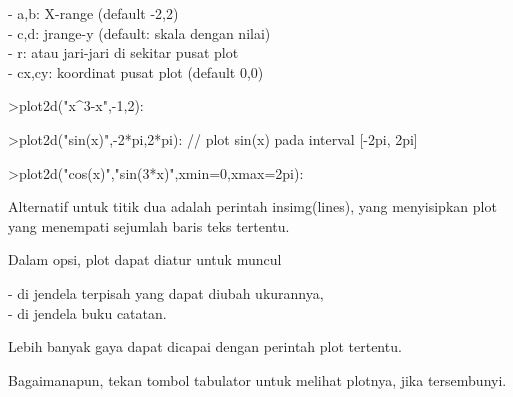 \documentclass[a4paper,10pt]{article}
\begin{document}
\begin{eulernotebook}
\begin{eulercomment}
\begin{eulercomment}
\begin{eulercomment}
\begin{eulercomment}
\begin{eulercomment}
\begin{eulercomment}
\begin{eulercomment}
\begin{eulercomment}
\begin{eulercomment}
\begin{eulercomment}
\begin{eulercomment}
\begin{eulercomment}
\begin{eulercomment}
\begin{eulercomment}
\begin{eulercomment}
- a,b: X-range (default -2,2)\\
- c,d: jrange-y (default: skala dengan nilai)\\
- r: atau jari-jari di sekitar pusat plot\\
- cx,cy: koordinat pusat plot (default 0,0)
\end{eulercomment}
\begin{eulerprompt}
>plot2d("x^3-x",-1,2):
\end{eulerprompt}
\begin{eulerprompt}
>plot2d("sin(x)",-2*pi,2*pi): // plot sin(x) pada interval [-2pi, 2pi]
\end{eulerprompt}
\begin{eulerprompt}
>plot2d("cos(x)","sin(3*x)",xmin=0,xmax=2pi):
\end{eulerprompt}
\begin{eulercomment}
Alternatif untuk titik dua adalah perintah insimg(lines), yang
menyisipkan plot yang menempati sejumlah baris teks tertentu.

Dalam opsi, plot dapat diatur untuk muncul

- di jendela terpisah yang dapat diubah ukurannya,\\
- di jendela buku catatan.

Lebih banyak gaya dapat dicapai dengan perintah plot tertentu.

Bagaimanapun, tekan tombol tabulator untuk melihat plotnya, jika
tersembunyi.


\end{eulercomment}
\end{eulercomment}
\end{eulercomment}
\end{eulercomment}
\end{eulercomment}
\end{eulercomment}
\end{eulercomment}
\end{eulercomment}
\end{eulercomment}
\end{eulercomment}
\end{eulercomment}
\end{eulercomment}
\end{eulercomment}
\end{eulercomment}
\end{eulercomment}
\end{eulernotebook}
\end{document}
